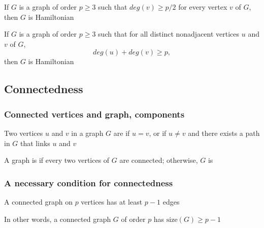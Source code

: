 \documentclass[aspectratio=43]{beamer}
\begin{document}
\begin{frame}
\begin{theorem}
	If $G$ is a graph of order $p\geq 3$ such that $deg(v)\geq p/2$ for every vertex $v$ of $G$, then $G$ is Hamiltonian
\end{theorem}
\vfill
\begin{theorem}
	If $G$ is a graph of order $p\geq 3$ such that for all distinct nonadjacent vertices $u$ and $v$ of $G$, $$deg(u)+deg(v)\geq p,$$ 
	then $G$ is Hamiltonian
\end{theorem}
\end{frame}


\subsection{Connectedness}

\begin{frame}\frametitle{Connected vertices and graph, components}
\begin{definition}
Two vertices $u$ and $v$ in a graph $G$ are  if $u=v$, or if $u\not =v$ and there exists a path in $G$ that links $u$ and $v$
\end{definition}
\vfill
\begin{definition}
A graph is  if every two vertices of $G$ are connected; otherwise, $G$ is 
\end{definition}
\end{frame}

\begin{frame}\frametitle{A necessary condition for connectedness}
	\begin{theorem}
		A connected graph on $p$ vertices has at least $p-1$ edges
	\end{theorem}
	\vfill
	In other words, a connected graph $G$ of order $p$ has $\text{size}(G)\geq p-1$
\end{frame}
\end{document}
